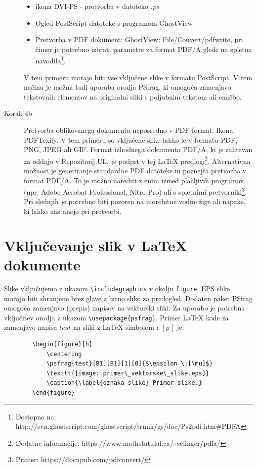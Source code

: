 \begin{description}
	\begin{itemize}[noitemsep]
		\item ikona DVI-PS - pretvorba v datoteko \emph{.ps}
		\item Ogled PostScript datoteke s programom GhostView
		\item Pretvorba v PDF dokument: GhostView: File/Convert/pdfwrite, pri čimer je potrebno izbrati parametre za format PDF/A glede na spletna navodila\footnote{Dostopno na: http://svn.ghostscript.com/ghostscript/trunk/gs/doc/Ps2pdf.htm\#PDFA}.
	\end{itemize}
	V tem primeru morajo biti vse vključene slike v formatu PostScript. V tem načinu je možna tudi uporaba orodja PSfrag, ki omogoča zamenjavo tekstovnih elementov na originalni sliki s poljubnim tekstom ali enačbo.
	\item[Korak 4b] Pretvorba oblikovanega dokumenta neposredno v PDF format. Ikona PDFTexify. V tem primeru so vključene slike lahko le v formatu PDF, PNG, JPEG ali GIF. Format izhodnega dokumenta PDF/A, ki je zahtevan za oddajo v Repozitorij UL, je podprt v tej LaTeX predlogi\footnote{Dodatne informacije: https://www.mathstat.dal.ca/\textasciitilde selinger/pdfa/}. Alternativna možnost je generiranje standardne PDF datoteke in poznejša pretvorba v format PDF/A. To je možno narediti z enim izmed plačljivih programov (npr. Adobe Acrobat Professional, Nitro Pro) ali s spletnimi pretvorniki\footnote{Primer: https://docupub.com/pdfconvert/}. Pri slednjih je potrebno biti pozoren na morebitne vodne žige ali napake, ki lahko nastanejo pri pretvorbi.
\end{description}

\chapter{Vključevanje slik v LaTeX dokumente} \label{prilogaB}

Slike vključujemo z ukazom \texttt{\textbackslash includegraphics} v okolju \texttt{figure}. EPS slike morajo biti shranjene brez glave z bitno sliko za predogled. Dodaten paket PSfrag omogoča zamenjavo (prepis) napisov na vektorski sliki. Za uporabo je potrebna vključitev orodja z ukazom \texttt{\textbackslash usepackage\{psfrag\}}. Primer LaTeX kode za zamenjavo napisa $test$ na sliki z LaTeX simbolom $\epsilon \;[\mu]$ je:

\begin{footnotesize}
	\begin{verbatim}
		\begin{figure}[h]
			\centering
			\psfrag{test}[B1][B1][1][0]{$\epsilon \;[\mu]$}
			\texttt{[image: primer\_vektorske\_slike.eps]}
			\caption{\label{oznaka_slike} Primer slike.}
		\end{figure}
	\end{verbatim}
\end{footnotesize}

